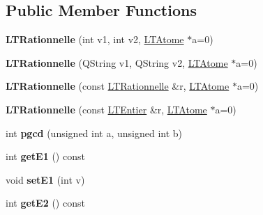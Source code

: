 \subsection*{Public Member Functions}
\begin{DoxyCompactItemize}
\item 
{\bfseries L\+T\+Rationnelle} (int v1, int v2, \hyperlink{class_l_t_atome}{L\+T\+Atome} $\ast$a=0)\hypertarget{class_l_t_rationnelle_ae6a4968b9cb89e964456c0a84ce2e4a8}{}\label{class_l_t_rationnelle_ae6a4968b9cb89e964456c0a84ce2e4a8}

\item 
{\bfseries L\+T\+Rationnelle} (Q\+String v1, Q\+String v2, \hyperlink{class_l_t_atome}{L\+T\+Atome} $\ast$a=0)\hypertarget{class_l_t_rationnelle_a518d0f2b06a9a8cf156bff2f693dd8b5}{}\label{class_l_t_rationnelle_a518d0f2b06a9a8cf156bff2f693dd8b5}

\item 
{\bfseries L\+T\+Rationnelle} (const \hyperlink{class_l_t_rationnelle}{L\+T\+Rationnelle} \&r, \hyperlink{class_l_t_atome}{L\+T\+Atome} $\ast$a=0)\hypertarget{class_l_t_rationnelle_ac82409ba58cce0624f0313dca86d979e}{}\label{class_l_t_rationnelle_ac82409ba58cce0624f0313dca86d979e}

\item 
{\bfseries L\+T\+Rationnelle} (const \hyperlink{class_l_t_entier}{L\+T\+Entier} \&r, \hyperlink{class_l_t_atome}{L\+T\+Atome} $\ast$a=0)\hypertarget{class_l_t_rationnelle_a12619dcec36d1bd347ec3c73a099d19c}{}\label{class_l_t_rationnelle_a12619dcec36d1bd347ec3c73a099d19c}

\item 
int {\bfseries pgcd} (unsigned int a, unsigned int b)\hypertarget{class_l_t_rationnelle_a8cc57db0cea018c34bfa9bc925913f93}{}\label{class_l_t_rationnelle_a8cc57db0cea018c34bfa9bc925913f93}

\item 
int {\bfseries get\+E1} () const \hypertarget{class_l_t_rationnelle_a425cc22d9f6605840866937382cffd2b}{}\label{class_l_t_rationnelle_a425cc22d9f6605840866937382cffd2b}

\item 
void {\bfseries set\+E1} (int v)\hypertarget{class_l_t_rationnelle_adedc58119f858549443fa0dc7ff1c34f}{}\label{class_l_t_rationnelle_adedc58119f858549443fa0dc7ff1c34f}

\item 
int {\bfseries get\+E2} () const \hypertarget{class_l_t_rationnelle_a3774fb07aa6fab1262b95f13b066ac8c}{}\label{class_l_t_rationnelle_a3774fb07aa6fab1262b95f13b066ac8c}


\end{DoxyCompactItemize}
